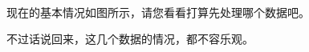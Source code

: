 \documentclass[11pt]{article}
\begin{document}
    \begin{center}
    \end{center}
    { \hspace*{\fill} \\}
    
    \begin{Verbatim}[commandchars=\\\{\}]


    \end{Verbatim}

    \begin{center}
    \end{center}
    { \hspace*{\fill} \\}
    
    现在的基本情况如图所示，请您看看打算先处理哪个数据吧。

    不过话说回来，这几个数据的情况，都不容乐观。


    
    
    
    
\end{document}

